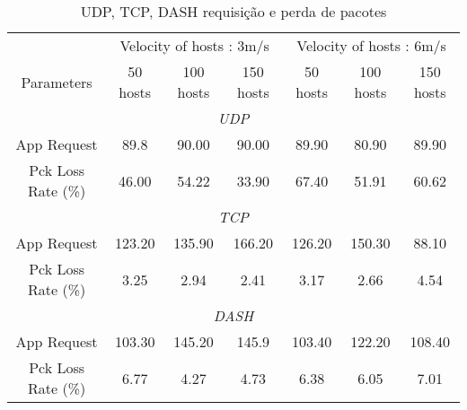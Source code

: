 \documentclass[12pt]{article}
\begin{document}
\begin{table}[h!]
  \centering
  \caption{UDP, TCP, DASH requisição e perda de pacotes}
  \begin{tabular}{c|ccc|ccc}
    \hline
    \multicolumn{1}{c}{} & \multicolumn{3}{c}{Velocity of hosts : 3m/s} & \multicolumn{3}{c}{Velocity of hosts : 6m/s} 			\\ 
    Parameters             & 50 hosts      & 100 hosts     & 150 hosts     &   50 hosts      & 100 hosts     & 150 hosts     		\\ 
    \hline
    \hline
    \multicolumn{7}{c}{\textit{UDP}} \\
    \hline
    \hline
    App Request            & 89.8   & 90.00   & 90.00 & 89.90  & 80.90    &  89.90  \\
    Pck Loss Rate (\%)     & 46.00  & 54.22   & 33.90 & 67.40  & 51.91    &  60.62   \\
    \hline
    \hline
    \multicolumn{7}{c}{\textit{TCP}} \\
    \hline
    \hline
    App Request            & 123.20    & 135.90   & 166.20     & 126.20  & 150.30    &  88.10  \\
    Pck Loss Rate (\%)     & 3.25      & 2.94     & 2.41       & 3.17    & 2.66      &  4.54  	\\
    \hline
    \hline
    \multicolumn{7}{c}{\textit{DASH}} \\
    \hline
    \hline
    App Request            & 103.30    & 145.20   & 145.9     & 103.40  & 122.20    &  108.40  \\
    Pck Loss Rate (\%)     & 6.77      & 4.27     & 4.73      & 6.38    & 6.05      &  7.01   \\
    \hline
  \end{tabular}
  \label{tab:tableperda}
\end{table}
\end{document}
